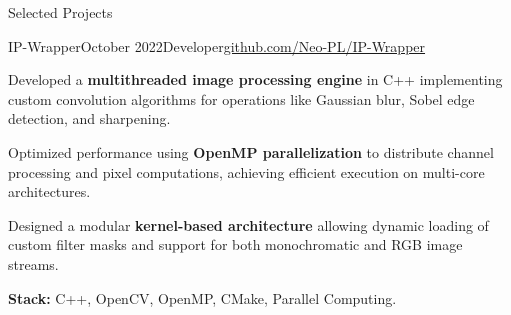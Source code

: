 
\begin{rSection}{Selected Projects}


    \begin{rSubsection}{IP-Wrapper}{October 2022}{Developer}{\href{https://github.com/Neo-PL/IP-Wrapper}{github.com/Neo-PL/IP-Wrapper}}
        \item Developed a \textbf{multithreaded image processing engine} in C++ implementing custom convolution algorithms for operations like Gaussian blur, Sobel edge detection, and sharpening.
        \item Optimized performance using \textbf{OpenMP parallelization} to distribute channel processing and pixel computations, achieving efficient execution on multi-core architectures.
        \item Designed a modular \textbf{kernel-based architecture} allowing dynamic loading of custom filter masks and support for both monochromatic and RGB image streams.
        \item \textbf{Stack:} C++, OpenCV, OpenMP, CMake, Parallel Computing.
    \end{rSubsection}


\end{rSection}
